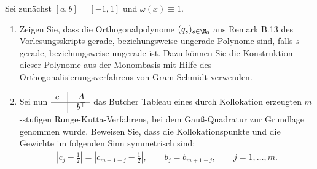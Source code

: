 \begin{exercise}
Sei zunächst $[a,b] = [-1,1]$ und $\omega(x) \equiv 1$.
\begin{enumerate}[label = \textbf{\alph*)}]
  \item Zeigen Sie, dass die Orthogonalpolynome $(q_s)_{s \in \N_0}$ aus Remark B.13
  des Vorlesungsskripts gerade, beziehungsweise ungerade Polynome sind, falls $s$
  gerade, beziehungsweise ungerade ist. Dazu können Sie die Konstruktion dieser
  Polynome aus der Monombasis mit Hilfe des Orthogonalisierungsverfahrens von
  Gram-Schmidt verwenden.
  \item
  \renewcommand{\arraystretch}{1.2}
  Sei nun ~$\begin{matrix}
    c & \vline & A \\
    \hline
    & \vline & b^{\top}
  \end{matrix}$~
  \renewcommand{\arraystretch}{1}
  das Butcher Tableau eines durch Kollokation erzeugten $m$-stufigen Runge-Kutta-Verfahrens,
  bei dem Gauß-Quadratur zur Grundlage genommen wurde. Beweisen Sie, dass die Kollokationspunkte
  und die Gewichte im folgenden Sinn symmetrisch sind:
  \begin{align}
    \left|c_j - \frac{1}{2}\right| = \left| c_{m + 1 - j} - \frac{1}{2}\right|,
    \qquad b_j = b_{m+1-j}, \qquad j = 1,\dots,m.
  \end{align}
\end{enumerate}
\end{exercise}
